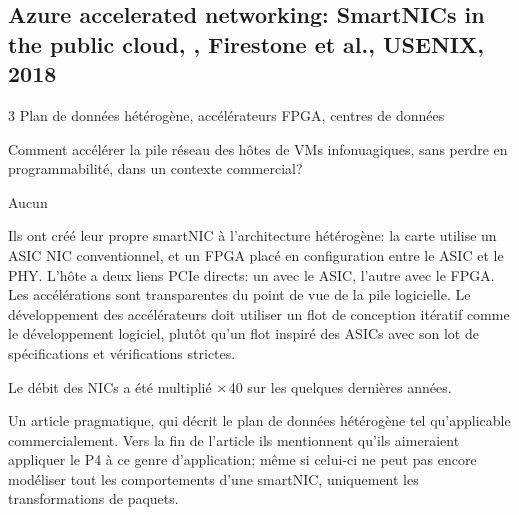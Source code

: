 
\subsection{Azure accelerated networking: SmartNICs in the public cloud, \cite{firestone_azure_2018}, Firestone et al., USENIX, 2018}

 3
 Plan de données hétérogène, accélérateurs FPGA, centres de données

 Comment accélérer la pile réseau des hôtes de VMs infonuagiques, sans perdre en programmabilité, dans un contexte commercial?

 Aucun

 Ils ont créé leur propre smartNIC à l'architecture hétérogène: la carte utilise un ASIC NIC conventionnel, et un FPGA placé en configuration  entre le ASIC et le PHY. L'hôte a deux liens PCIe directs: un avec le ASIC, l'autre avec le FPGA. Les accélérations sont transparentes du point de vue de la pile logicielle. Le développement des accélérateurs doit utiliser un flot de conception itératif comme le développement logiciel, plutôt qu'un flot inspiré des ASICs avec son lot de spécifications et vérifications strictes.


Le débit des NICs a été multiplié $\times$40 sur les quelques dernières années.

 Un article pragmatique, qui décrit le plan de données hétérogène tel qu'applicable commercialement. Vers la fin de l'article ils mentionnent qu'ils aimeraient appliquer le P4 à ce genre d'application; même si celui-ci ne peut pas encore modéliser tout les comportements d'une smartNIC, uniquement les transformations de paquets.

\clearpage
